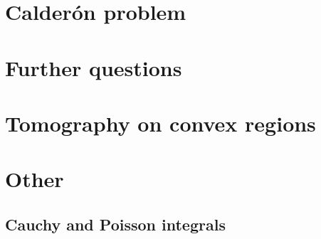 \documentclass[12pt]{article}
\begin{document}
\section{Calder\'on problem}



\section{Further questions}


\section{Tomography on convex regions}


\section{Other}

\subsection{Cauchy and Poisson integrals}
\end{document}
